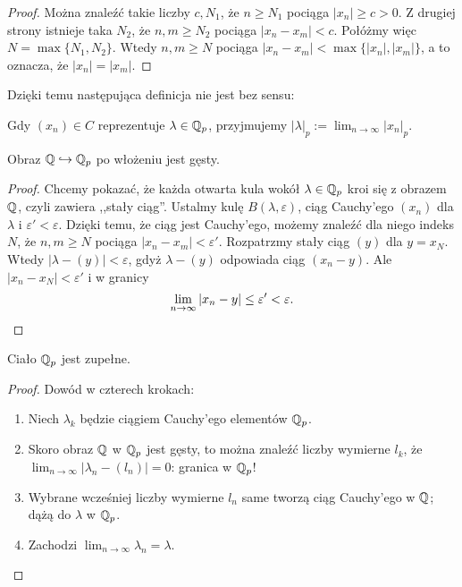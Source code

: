 \begin{proof}
	Można znaleźć takie liczby $c, N_1$, że $n \ge N_1$ pociąga $|x_n| \ge c > 0$.
	Z drugiej strony istnieje taka $N_2$, że $n, m \ge N_2$ pociąga $|x_n - x_m| < c$.
	Połóżmy więc $N = \max\{N_1, N_2\}$.
	Wtedy $n, m \ge N$ pociąga $|x_n - x_m| < \max\{|x_n|, |x_m|\}$, a to oznacza, że $|x_n| = |x_m|$.
\end{proof}

Dzięki temu następująca definicja nie jest bez sensu:

\begin{definicja}
	Gdy $(x_n) \in C$ reprezentuje $\lambda \in \mathbb{Q}_p$, przyjmujemy $|\lambda|_p := \lim_{n \to \infty} |x_n|_p$.
\end{definicja}

\begin{lemat}
	Obraz $\mathbb{Q} \hookrightarrow \mathbb{Q}_p$ po włożeniu jest gęsty.
\end{lemat}

\begin{proof}
	Chcemy pokazać, że każda otwarta kula wokół $\lambda \in \mathbb{Q}_p$ kroi się z obrazem $\mathbb{Q}$, czyli zawiera ,,stały ciąg''.
	Ustalmy kulę $B(\lambda, \varepsilon)$, ciąg Cauchy'ego $(x_n)$ dla $\lambda$ i $\varepsilon' < \varepsilon$.
	Dzięki temu, że ciąg jest Cauchy'ego, możemy znaleźć dla niego indeks $N$, że $n, m \ge N$ pociąga $|x_n - x_m| < \varepsilon'$.
	Rozpatrzmy stały ciąg $(y)$ dla $y = x_N$.
	Wtedy $|\lambda - (y)| < \varepsilon$, gdyż $\lambda - (y)$ odpowiada ciąg $(x_n-y)$.
	Ale $|x_n - x_N| < \varepsilon'$ i w granicy
	\[
		\lim_{n \to \infty}|x_n - y| \le \varepsilon' < \varepsilon. \qedhere
	\]
\end{proof}

\begin{fakt}
	Ciało $\mathbb{Q}_p$ jest zupełne.
\end{fakt}

\begin{proof} Dowód w czterech krokach:
	\begin{enumerate}
		\item Niech $\lambda_k$ będzie ciągiem Cauchy'ego elementów $\mathbb{Q}_p$. \item Skoro obraz $\mathbb{Q}$ w $\mathbb{Q}_p$ jest gęsty, to można znaleźć liczby wymierne $l_k$, że $\lim_{n \to \infty} |\lambda_n - (l_n)| = 0$: granica w $\mathbb{Q}_p$!
		\item Wybrane wcześniej liczby wymierne $l_n$ same tworzą ciąg Cauchy'ego w $\mathbb{Q}$; dążą do $\lambda$ w $\mathbb{Q}_p$.
		\item Zachodzi $\lim_{n \to \infty} \lambda_n = \lambda$. \qedhere
	\end{enumerate}
\end{proof}